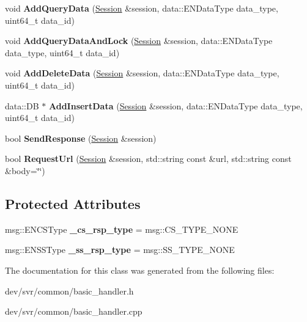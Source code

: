 \begin{DoxyCompactItemize}
\item 
\hypertarget{classBasicHandler_af28ec40eb803adee1b5691ca37e94ea5}{
void {\bfseries AddQueryData} (\hyperlink{classSession}{Session} \&session, data::ENDataType data\_\-type, uint64\_\-t data\_\-id)}
\label{classBasicHandler_af28ec40eb803adee1b5691ca37e94ea5}

\item 
\hypertarget{classBasicHandler_a5793e0b81e4884a89bae922f32c0a46d}{
void {\bfseries AddQueryDataAndLock} (\hyperlink{classSession}{Session} \&session, data::ENDataType data\_\-type, uint64\_\-t data\_\-id)}
\label{classBasicHandler_a5793e0b81e4884a89bae922f32c0a46d}

\item 
\hypertarget{classBasicHandler_af8f1fab5ca5bd961b12e780fd5db7edb}{
void {\bfseries AddDeleteData} (\hyperlink{classSession}{Session} \&session, data::ENDataType data\_\-type, uint64\_\-t data\_\-id)}
\label{classBasicHandler_af8f1fab5ca5bd961b12e780fd5db7edb}

\item 
\hypertarget{classBasicHandler_a88d6b42d02783d07b9588227efd34a68}{
data::DB $\ast$ {\bfseries AddInsertData} (\hyperlink{classSession}{Session} \&session, data::ENDataType data\_\-type, uint64\_\-t data\_\-id)}
\label{classBasicHandler_a88d6b42d02783d07b9588227efd34a68}

\item 
\hypertarget{classBasicHandler_acca46fa7be71d474186e1fa5db504374}{
bool {\bfseries SendResponse} (\hyperlink{classSession}{Session} \&session)}
\label{classBasicHandler_acca46fa7be71d474186e1fa5db504374}

\item 
\hypertarget{classBasicHandler_a229999ba14046324f765930ec8ea5220}{
bool {\bfseries RequestUrl} (\hyperlink{classSession}{Session} \&session, std::string const \&url, std::string const \&body=\char`\"{}\char`\"{})}
\label{classBasicHandler_a229999ba14046324f765930ec8ea5220}

\end{DoxyCompactItemize}
\subsection*{Protected Attributes}
\begin{DoxyCompactItemize}
\item 
\hypertarget{classBasicHandler_af833cfccfd57d804801f1915e8a4957e}{
msg::ENCSType {\bfseries \_\-cs\_\-rsp\_\-type} = msg::CS\_\-TYPE\_\-NONE}
\label{classBasicHandler_af833cfccfd57d804801f1915e8a4957e}

\item 
\hypertarget{classBasicHandler_a636082f170090ccb25487b71dd710cb8}{
msg::ENSSType {\bfseries \_\-ss\_\-rsp\_\-type} = msg::SS\_\-TYPE\_\-NONE}
\label{classBasicHandler_a636082f170090ccb25487b71dd710cb8}

\end{DoxyCompactItemize}


The documentation for this class was generated from the following files:\begin{DoxyCompactItemize}
\item 
dev/svr/common/basic\_\-handler.h\item 
dev/svr/common/basic\_\-handler.cpp\end{DoxyCompactItemize}
